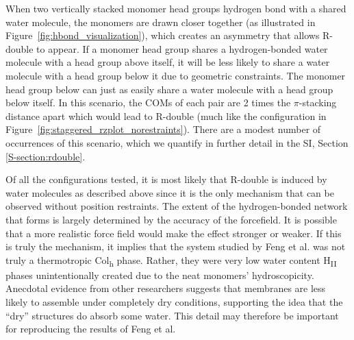 \documentclass[journal=jpcbfk,manuscript=article]{achemso}
\begin{document}
  When two vertically stacked monomer head groups hydrogen bond with a shared
  water molecule, the monomers are drawn closer together (as illustrated in
  Figure~\ref{fig:hbond_visualization}), which creates an asymmetry that allows
  R-double to appear. If a monomer head group shares a hydrogen-bonded water
  molecule with a head group above itself, it will be less likely to share a
  water molecule with a head group below it due to geometric constraints. The
  monomer head group below can just as easily share a water molecule with a head
  group below itself. In this scenario, the COMs of each pair are 2 times the
  $\pi$-stacking distance apart which would lead to R-double (much like the
  configuration in Figure~\ref{fig:staggered_rzplot_norestraints}). There are a
  modest number of occurrences of this scenario, which we quantify in further
  detail in the SI, Section \ref{S-section:rdouble}.  
  
  Of all the configurations tested, it is most likely that R-double is induced
  by water molecules as described above since it is the only mechanism that can
  be observed without position restraints. The extent of the hydrogen-bonded
  network that forms is largely determined by the accuracy of the forcefield. It
  is possible that a more realistic force field would make the effect stronger or
  weaker. If this is truly the mechanism, it implies that the system studied by
  Feng et al.\cite{feng_scalable_2014,feng_thin_2016} was not truly a
  thermotropic Col\textsubscript{h} phase. Rather, they were very low water
  content H\textsubscript{II} phases unintentionally created due to the neat
  monomers' hydroscopicity.  Anecdotal evidence from other researchers suggests
  that membranes are less likely to assemble under completely dry
  conditions, supporting the idea %
  that the ``dry'' structures do absorb some water. This detail may therefore be
  important for reproducing the results of Feng et al.
\end{document}
